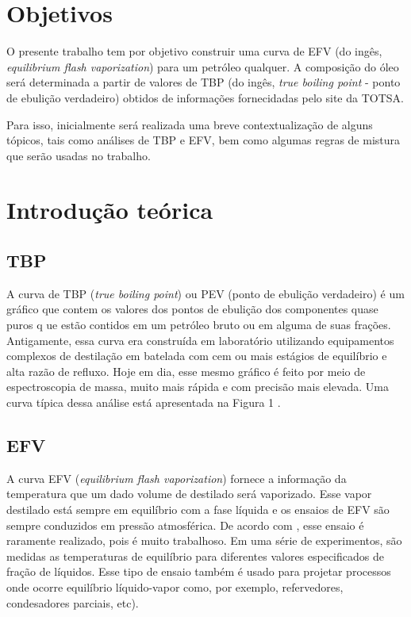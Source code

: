 \section{Objetivos}
O presente trabalho tem por objetivo construir uma curva de EFV (do
ingês, \emph{equilibrium flash vaporization}) para um petróleo qualquer. A
composição do óleo será determinada a partir de valores de TBP (do ingês,
\emph{true boiling point} - ponto de ebulição verdadeiro) obtidos de
informações fornecidadas pelo site da TOTSA.

Para isso, inicialmente será realizada uma breve contextualização de alguns
tópicos, tais como análises de TBP e EFV, bem como algumas regras de mistura
que serão usadas no trabalho.

\section{Introdução teórica}

\subsection{TBP}
A curva de TBP (\emph{true boiling point}) ou PEV (ponto de ebulição verdadeiro)
é um gráfico que contem os valores dos pontos de ebulição  dos componentes quase puros q
ue estão contidos em um petróleo bruto ou em alguma de suas frações. Antigamente, 
essa curva era construída em laboratório utilizando equipamentos complexos de 
destilação em batelada com cem ou mais estágios de equilíbrio e alta razão de 
refluxo. Hoje em dia, esse mesmo gráfico é feito por meio de espectroscopia de massa, 
muito mais rápida e com precisão mais elevada. Uma curva típica dessa análise está 
apresentada na Figura 1 \cite{Jones2006}.

\subsection{EFV}


A curva EFV (\emph{equilibrium flash vaporization}) fornece a informação da
temperatura que um dado volume de destilado será vaporizado. Esse vapor
destilado está sempre em equilíbrio com a fase líquida e os ensaios de EFV são
sempre conduzidos em pressão atmosférica. De acordo com ,
esse ensaio é raramente realizado, pois é muito trabalhoso. Em uma série de
experimentos, são medidas as temperaturas de equilíbrio para diferentes valores especificados de 
 fração de líquidos. Esse tipo de ensaio também é usado para projetar processos
 onde ocorre equilíbrio líquido-vapor como, por exemplo, refervedores, condesadores
  parciais, etc).
  
